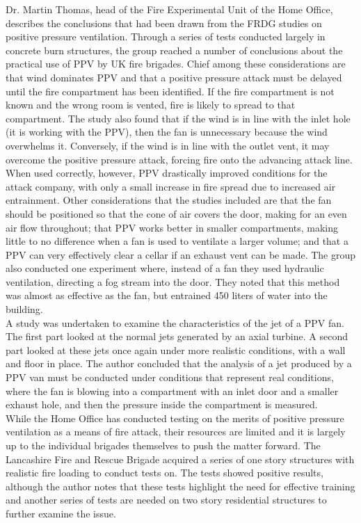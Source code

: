 \documentclass{article}
\begin{document}
Dr. Martin Thomas, head of the Fire Experimental Unit of the Home Office, describes the conclusions that had been drawn from the FRDG studies on positive pressure ventilation. Through a series of tests conducted largely in concrete burn structures, the group reached a number of conclusions about the practical use of PPV by UK fire brigades. Chief among these considerations are that wind dominates PPV and that a positive pressure attack must be delayed until the fire compartment has been identified. If the fire compartment is not known and the wrong room is vented, fire is likely to spread to that compartment. The study also found that if the wind is in line with the inlet hole (it is working with the PPV), then the fan is unnecessary because the wind overwhelms it. Conversely, if the wind is in line with the outlet vent, it may overcome the positive pressure attack, forcing fire onto the advancing attack line. When used correctly, however, PPV drastically improved conditions for the attack company, with only a small increase in fire spread due to increased air entrainment. Other considerations that the studies included are that the fan should be positioned so that the cone of air covers the door, making for an even air flow throughout; that PPV works better in smaller compartments, making little to no difference when a fan is used to ventilate a larger volume; and that a PPV can very effectively clear a cellar if an exhaust vent can be made. The group also conducted one experiment where, instead of a fan they used hydraulic ventilation, directing a fog stream into the door. They noted that this method was almost as effective as the fan, but entrained 450 liters of water into the building.\cite{HomeOfficeRes}\\
	
A study was undertaken to examine the characteristics of the jet of a PPV fan. The first part looked at the normal jets generated by an axial turbine. A second part looked at these jets once again under more realistic conditions, with a wall and floor in place. The author concluded that the analysis of a jet produced by a PPV van must be conducted under conditions that represent real conditions, where the fan is blowing into a compartment with an inlet door and a smaller exhaust hole, and then the pressure inside the compartment is measured.\cite{AxialTurbine}\\
	
While the Home Office has conducted testing on the merits of positive pressure ventilation as a means of fire attack, their resources are limited and it is largely up to the individual brigades themselves to push the matter forward. The Lancashire Fire and Rescue Brigade acquired a series of one story structures with realistic fire loading to conduct tests on. The tests showed positive results, although the author notes that these tests highlight the need for effective training and another series of tests are needed on two story residential structures to further examine the issue.\cite{StottSingleStory}\\
	
\end{document}

